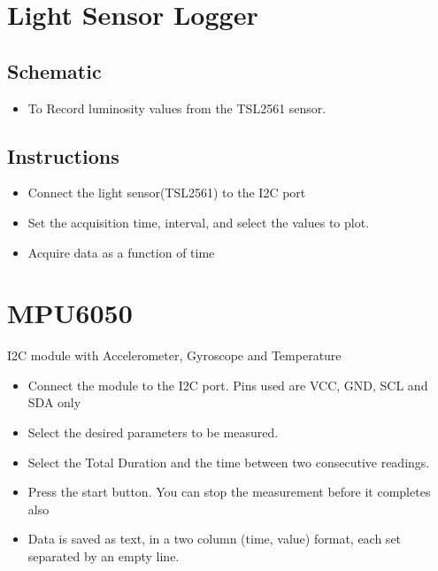 \documentclass[a4paper,12pt,english]{sphinxmanual}
\let\sphinxpxdimen\pdfpxdimen\else\newdimen\sphinxpxdimen
\begin{document}
\section{Light Sensor Logger}
\label{\detokenize{8.2:light-sensor-logger}}\label{\detokenize{8.2::doc}}

\subsection{Schematic}
\label{\detokenize{8.2:schematic}}\begin{itemize}
\item {} 
To Record luminosity values from the TSL2561 sensor.

\end{itemize}


\subsection{Instructions}
\label{\detokenize{8.2:instructions}}\begin{itemize}
\item {} 
Connect the light sensor(TSL2561) to the I2C port

\item {} 
Set the acquisition time, interval, and select the values to plot.

\item {} 
Acquire data as a function of time

\end{itemize}


\section{MPU6050}
\label{\detokenize{8.3:mpu6050}}\label{\detokenize{8.3::doc}}
\noindent\sphinxincludegraphics[width=300\sphinxpxdimen]{{MPU6050}.pdf}

I2C module with Accelerometer, Gyroscope and Temperature
\begin{itemize}
\item {} 
Connect the module to the I2C port. Pins used are VCC, GND, SCL and SDA only

\item {} 
Select the desired parameters to be measured.

\item {} 
Select the Total Duration and the time between two consecutive readings.

\item {} 
Press the start button. You can stop the measurement before it completes also

\item {} 
Data is saved as text, in a two column (time, value) format, each set separated by an empty line.

\end{itemize}
\end{document}
